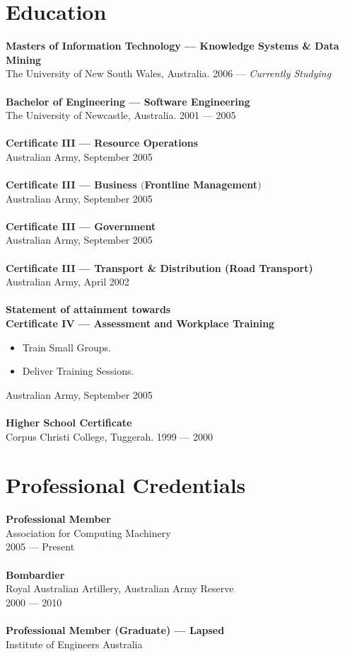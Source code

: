 \documentclass[a4paper]{article}
\begin{document}
\section*{Education}
\textbf{Masters of Information Technology --- Knowledge Systems \& Data Mining}\\
The University of New South Wales, Australia. 2006 --- \emph{Currently Studying}\\\\
\textbf{Bachelor of Engineering --- Software Engineering}\\
The University of Newcastle, Australia. 2001 --- 2005\\\\
\textbf{Certificate III --- Resource Operations}\\
Australian Army, September 2005\\\\
\textbf{Certificate III --- Business $($Frontline Management$)$}\\
Australian Army, September 2005\\\\
\textbf{Certificate III --- Government}\\
Australian Army, September 2005\\\\
\textbf{Certificate III --- Transport \& Distribution (Road Transport)}\\
Australian Army, April 2002\\\\
\textbf{Statement of attainment towards\\Certificate IV --- Assessment and Workplace Training}
\begin{itemize}
\item Train Small Groups.
\item Deliver Training Sessions.
\end{itemize}
Australian Army, September 2005\\\\
\textbf{Higher School Certificate}\\
Corpus Christi College, Tuggerah. 1999 --- 2000

\vspace{5pt}
\section*{Professional Credentials}
\textbf{Professional Member}\\
Association for Computing Machinery\\
2005 --- Present\\\\
\textbf{Bombardier}\\
Royal Australian Artillery, Australian Army Reserve\\
2000 --- 2010\\\\
\textbf{Professional Member (Graduate) --- Lapsed}\\
Institute of Engineers Australia
\end{document}
